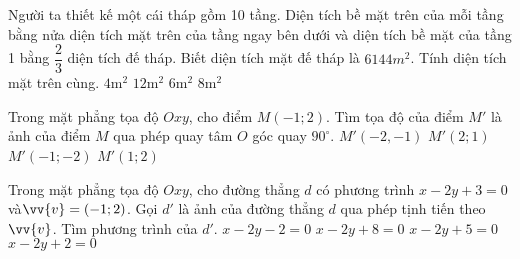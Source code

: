 \begin{ex}%
	Người ta thiết kế một cái tháp gồm 10 tầng. Diện tích bề mặt trên của mỗi tầng bằng nửa diện tích mặt trên của tầng ngay bên dưới và diện tích bề mặt của tầng 1 bằng $ \dfrac{2}{3} $ diện tích đế tháp. Biết diện tích mặt đế tháp là $ 6144 m^2 $. Tính diện tích mặt trên cùng.
	\choice
	{$ 4$m$^2 $}
	{$ 12$m$^2 $}
	{$ 6$m$^2 $}
	{\True $ 8$m$^2 $}
\end{ex}
\begin{ex}%
	Trong mặt phẳng tọa độ $Oxy$, cho điểm $M(-1;2)$. Tìm tọa độ của điểm $M'$ là ảnh của	điểm $M$ qua phép quay tâm $O$ góc quay $90^ \circ$.
	\choice
	{\True $M'(-2,-1)$}
	{$M'(2;1)$}
	{$M'(-1;-2)$}
	{$M'(1;2)$}
\end{ex}	
\begin{ex}%
	Trong mặt phẳng tọa độ $Oxy$, cho đường thẳng $d$ có phương trình $x-2y+3=0$ và$\vv{v} = (-1;2)$. Gọi $d'$ là ảnh của đường thẳng $d$ qua phép tịnh tiến theo $\vv{v}$. Tìm phương trình của $d'$.
	\choice
	{$x-2y-2=0$}
	{$x-2y+8=0$}
	{\True $x-2y+5=0$}
	{$x-2y+2=0$}
\end{ex}	
